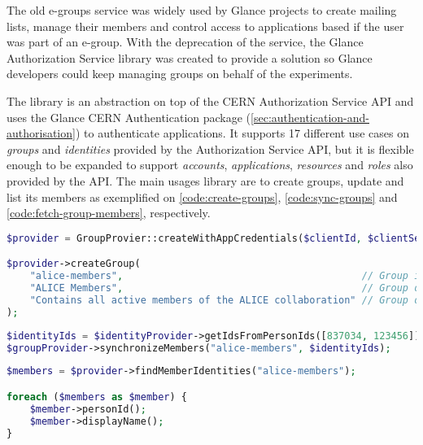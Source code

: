 The old e-groups service was widely used by Glance projects to create mailing lists, manage their members and control access to applications based if the user was part of an e-group. With the deprecation of the service, the Glance Authorization Service library \cite{glance-authz-service} was created to provide a solution so Glance developers could keep managing groups on behalf of the experiments.

The library is an abstraction on top of the CERN Authorization Service API \cite{authz-service-api} and uses the Glance CERN Authentication package (\autoref{sec:authentication-and-authorisation}) to authenticate applications. It supports 17 different use cases on \textit{groups} and \textit{identities} provided by the Authorization Service API, but it is flexible enough to be expanded to support \textit{accounts}, \textit{applications}, \textit{resources} and \textit{roles} also provided by the API.  The main usages library are to create groups, update and list its members as exemplified on \autoref{code:create-groups}, \autoref{code:sync-groups} and \autoref{code:fetch-group-members}, respectively.

\begin{lstlisting}[language=PHP,label={code:create-groups},caption={TODO}]
$provider = GroupProvier::createWithAppCredentials($clientId, $clientSecret);

$provider->createGroup(
	"alice-members",                                         // Group identifier
	"ALICE Members",                                         // Group display name
	"Contains all active members of the ALICE collaboration" // Group description
);
\end{lstlisting}

\begin{lstlisting}[language=PHP,label={code:sync-groups},caption={TODO}]
$identityIds = $identityProvider->getIdsFromPersonIds([837034, 123456]);
$groupProvider->synchronizeMembers("alice-members", $identityIds);
\end{lstlisting}


\begin{lstlisting}[language=PHP,label={code:fetch-group-members},caption={TODO}]
$members = $provider->findMemberIdentities("alice-members");

foreach ($members as $member) {
	$member->personId();
	$member->displayName();
}
\end{lstlisting}
